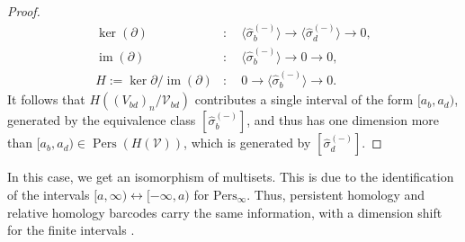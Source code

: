 \begin{proof}{\textit{\cite[Proof of Proposition 2.4]{de2011dualities}}}
\begin{align}
\ker(\partial) &: \quad \langle \hat{\sigma}^{(-)}_b \rangle \rightarrow \langle \hat{\sigma}^{(-)}_d \rangle \rightarrow 0, \nonumber\\
\operatorname{im}(\partial) &: \quad \langle \hat{\sigma}^{(-)}_b \rangle \rightarrow 0 \rightarrow 0,\nonumber\\
H := \ker{\partial} / \operatorname{im}(\partial) &: \quad 0 \rightarrow \langle \hat{\sigma}^{(-)}_b \rangle \rightarrow 0.
\end{align}
It follows that $H((V_{bd})_n/\mathcal{V}_{bd})$ contributes a single interval of the form $[a_b,a_d)$, generated by the equivalence class $[\hat{\sigma}^{(-)}_b]$, and thus has one dimension more than $[a_b,a_d) \in \operatorname{Pers}(H(\mathcal{V}))$, which is generated by $[\hat{\sigma}^{(-)}_d]$.
\end{proof}

\begin{remark}
	In this case, we get an isomorphism of multisets. This is due to the identification
	of the intervals $[a,\infty) \leftrightarrow [-\infty, a)$ for $\mathrm{Pers}_{\infty}$.
	Thus, persistent homology and relative homology barcodes carry the same information,
	with a dimension shift for the finite intervals \cite[Proposition 2.4]{de2011dualities}.
\end{remark}

